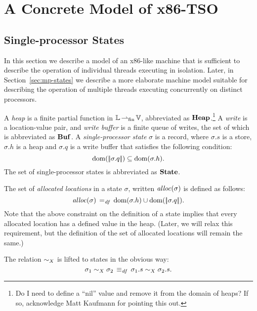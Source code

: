 \documentclass[11pt]{report}
\begin{document}
\chapter{A Concrete Model of x86-TSO}

\section{Single-processor States} %
\label{sec:sp-states}

In this section we describe a model of an x86-like machine that is sufficient to describe the operation of individual threads executing in isolation. Later, in Section~\ref{sec:mp-states} we describe a more elaborate machine model suitable for describing the operation of multiple threads executing concurrently on distinct processors.

A \emph{heap} is a finite partial function in $\mathbb{L} \operatorname{\operatorname{\rightharpoonup}_{\mathrm{fin}}} \mathbb{V}$, abbreviated as $\mathbf{Heap}$.\footnote{Do I need to define a ``nil'' value and remove it from the domain of heaps? If so, acknowledge Matt Kaufmann for pointing this out.} A \emph{write} is a location-value pair, and \emph{write buffer} is a finite queue of writes, the set of which is abbreviated as $\mathbf{Buf}$. %
A \emph{single-processor state} $\sigma$ is a record, where $\sigma.s$ is a store, $\sigma.h$ is a heap and $\sigma.q$ is a write buffer that satisfies the following condition: \[ \operatorname{\mathrm{dom}}(|\!|\sigma.q|\!|) \subseteq \operatorname{\mathrm{dom}}(\sigma.h).\] The set of single-processor states is abbreviated as $\mathbf{State}$. 

The set of \emph{allocated locations} in a state $\sigma$, written $\mathit{alloc}(\sigma)$ is defined as follows: \[ \mathit{alloc}(\sigma) \operatorname{\;=_{\mathit{df}}\;} \operatorname{\mathrm{dom}}(\sigma.h) \cup \operatorname{\mathrm{dom}}(|\!|\sigma.q|\!|). \] Note that the above constraint on the definition of a state implies that every allocated location has a defined value in the heap. (Later, we will relax this requirement, but the definition of the set of allocated locations will remain the same.)

The relation $\sim_{X}$ is lifted to states in the obvious way: \[ \sigma_1 \sim_{X} \sigma_2 \operatorname{\;\equiv_{\mathit{df}}\;} \sigma_1.s \sim_{X} \sigma_2.s.\]

\end{document}
